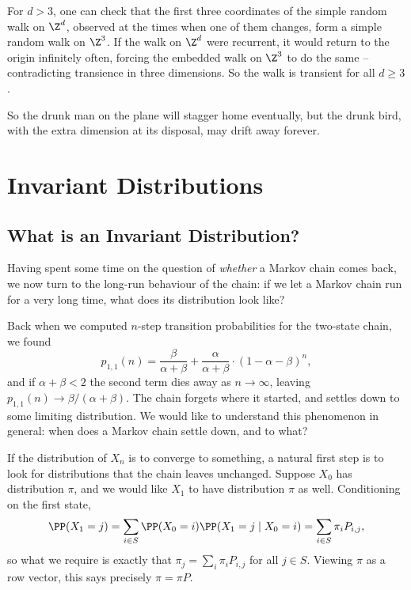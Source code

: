 \begin{remark}
	For $d > 3$, one can check that the first three coordinates of the simple random walk on $\Z^d$, observed at the times when one of them changes, form a simple random walk on $\Z^3$. If the walk on $\Z^d$ were recurrent, it would return to the origin infinitely often, forcing the embedded walk on $\Z^3$ to do the same -- contradicting transience in three dimensions. So the walk is transient for all $d \geq 3$.
\end{remark}

So the drunk man on the plane will stagger home eventually, but the drunk bird, with the extra dimension at its disposal, may drift away forever.

\section{Invariant Distributions}

\subsection{What is an Invariant Distribution?}

Having spent some time on the question of \emph{whether} a Markov chain comes back, we now turn to the long-run behaviour of the chain: if we let a Markov chain run for a very long time, what does its distribution look like?

Back when we computed $n$-step transition probabilities for the two-state chain, we found
$$
p_{1, 1}(n) = \frac{\beta}{\alpha+\beta}+\frac{\alpha}{\alpha+\beta} \cdot(1-\alpha-\beta)^{n},
$$
and if $\alpha + \beta < 2$ the second term dies away as $n \to \infty$, leaving $p_{1, 1}(n) \rightarrow \beta/(\alpha + \beta)$. The chain forgets where it started, and settles down to some limiting distribution. We would like to understand this phenomenon in general: when does a Markov chain settle down, and to what?

If the distribution of $X_n$ is to converge to something, a natural first step is to look for distributions that the chain leaves unchanged. Suppose $X_0$ has distribution $\pi$, and we would like $X_1$ to have distribution $\pi$ as well. Conditioning on the first state,
$$
\PP(X_1 = j) = \sum_{i \in S} \PP(X_0 = i)\PP(X_1 = j \mid X_0 = i) = \sum_{i \in S} \pi_i P_{i, j},
$$
so what we require is exactly that $\pi_j = \sum_{i} \pi_i P_{i, j}$ for all $j \in S$. Viewing $\pi$ as a row vector, this says precisely $\pi = \pi P$.

